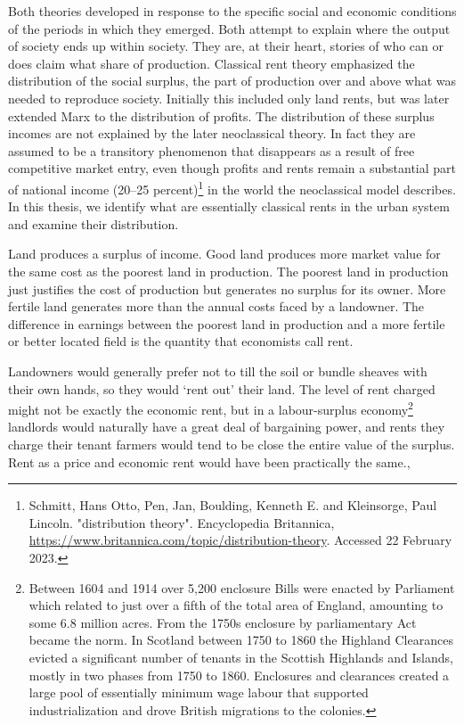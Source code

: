 Both theories developed in response to the specific social and economic conditions of the periods in which they emerged. Both attempt to explain where the output of society ends up within society. They are, at their heart, stories of who  can or does claim what share of production.  Classical rent theory  emphasized the distribution of the social \gls{surplus}, the part of production  over and above what was needed to reproduce society. Initially this included only land rents, but was later extended Marx to the distribution of profits.  The distribution of these surplus incomes are not explained by the later neoclassical theory. In fact they are assumed to be a transitory phenomenon that disappears as a result of free competitive market entry, even though profits and rents remain a substantial part of national income (20–25 percent)\footnote{Schmitt, Hans Otto, Pen, Jan, Boulding, Kenneth E. and Kleinsorge, Paul Lincoln. "distribution theory". Encyclopedia Britannica,  \url{https://www.britannica.com/topic/distribution-theory}. Accessed 22 February 2023.} in the world the neoclassical model describes. In this thesis, we identify what are essentially classical rents in the urban system and examine their distribution. 


 Land produces a surplus of income. Good land produces more market value for the same cost as the poorest land in production. The poorest land in production  just justifies the cost of production but generates no surplus for its owner. More fertile land  generates more than the annual costs faced by a landowner. The difference in earnings between the poorest land in production and a more fertile or better located field is the quantity that economists call rent. 
 
 Landowners would generally prefer not to till the soil or bundle sheaves with their own hands, so they would `rent out' their land. The level of rent charged might not be exactly the economic rent, but in a labour-surplus economy\footnote{Between 1604 and 1914 over 5,200 enclosure Bills were enacted by Parliament which related to just over a fifth of the total area of England, amounting to some 6.8 million acres. From the 1750s enclosure by parliamentary Act became the norm. In Scotland  between 1750 to 1860 the  Highland Clearances  evicted a significant number of tenants in the Scottish Highlands and Islands, mostly in two phases from 1750 to 1860. Enclosures and clearances created a large pool of essentially minimum wage labour that supported industrialization and drove British migrations to the colonies. } landlords would naturally have a great deal of bargaining power, and rents they charge their tenant farmers would tend to be close the entire value of the surplus. Rent as a price and economic rent would have been practically the same.,


